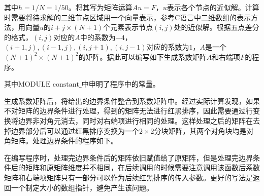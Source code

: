 \documentclass{article}
\begin{document}
其中$h=1/N=1/50$。将其写为矩阵运算$Au=F$，$u$表示各个节点的近似解。计算时需要将待求解的二维节点区域用一个向量表示，参考C语言中二维数组的表示方法，用向量$u$的$i+j\times (N+1)$个元素表示节点$(i,j)$处的近似解。根据五点差分的格式，$(i,j)$对应的$A$中的系数为$-4$，$(i+1,j),(i-1,j),(i,j+1),(i,j-1)$对应的系数为$1$，$A$是一个$(N+1)^{2}\times(N+1)^{2}$的矩阵。据此可以编写如下生成系数矩阵$A$和右端项$F$的程序。

\begin{center}
	\setlength{\fboxsep}{0.3pt}
	
\end{center}

其中$\textrm{MODULE constant\_}$中申明了程序中的常量。

\begin{center}
	\setlength{\fboxsep}{0.3pt}
	
\end{center}

生成系数矩阵后，将给出的边界条件整合到系数矩阵中。经过实际计算发现，如果不对矩阵的边界条件进行处理，得到的矩阵无法进行红黑排序，因此需要通过行变换将边界非对角元消去，同时对右端项进行相同的处理。这样处理之后的矩阵在去掉边界部分后可以通过红黑排序变换为一个$2\times 2$分块矩阵，其两个对角块均是对角矩阵。处理边界条件的程序如下。

\begin{center}
	\setlength{\fboxsep}{0.3pt}
	
\end{center}

在编写程序时，处理完边界条件后的矩阵依旧赋值给了原矩阵，但是处理完边界条件后的矩阵和原矩阵维度并不相同，在后续调用的时候需要注意调用该函数后系数矩阵和右端项矩阵只有一部分可以作为后续红黑排序的传入参数。更好的写法是返回一个制定大小的数组指针，避免产生该问题。
\end{document}
